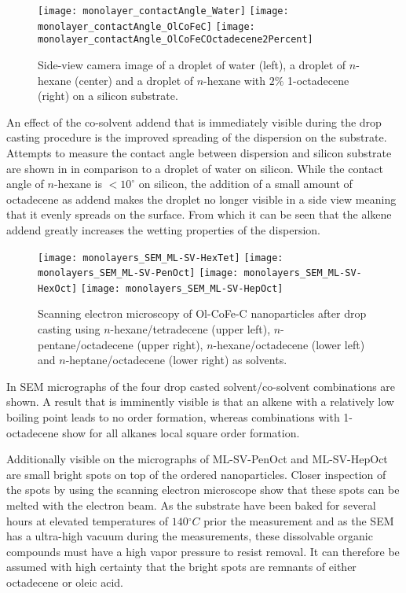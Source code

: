 \documentclass[\main/dresen_thesis.tex]{subfiles}
\begin{document}
    \begin{figure}[tb]
      \centering
      \texttt{[image: monolayer\_contactAngle\_Water]}
      \texttt{[image: monolayer\_contactAngle\_OlCoFeC]}
      \texttt{[image: monolayer\_contactAngle\_OlCoFeCOctadecene2Percent]}
      \caption{\label{fig:monolayers:preparation:contactAngle}Side-view camera image of a droplet of water (left), a droplet of $\mathit{n}$-hexane (center) and a droplet of $\mathit{n}$-hexane with $2 \unit{\%}$ 1-octadecene (right) on a silicon substrate.}
    \end{figure}
    An effect of the co-solvent addend that is immediately visible during the drop casting procedure is the improved spreading of the dispersion on the substrate.
    Attempts to measure the contact angle between dispersion and silicon substrate are shown in  in comparison to a droplet of water on silicon.
    While the contact angle of $\mathit{n}$-hexane is $<10^\circ$ on silicon, the addition of a small amount of octadecene as addend makes the droplet no longer visible in a side view meaning that it evenly spreads on the surface.
    From which it can be seen that the alkene addend greatly increases the wetting properties of the dispersion.

    \begin{figure}[tb]
      \centering
      \texttt{[image: monolayers\_SEM\_ML-SV-HexTet]}
      \texttt{[image: monolayers\_SEM\_ML-SV-PenOct]}
      \texttt{[image: monolayers\_SEM\_ML-SV-HexOct]}
      \texttt{[image: monolayers\_SEM\_ML-SV-HepOct]}
      \caption{\label{fig:monolayers:preparation:solventVariation:sem}Scanning electron microscopy of Ol-CoFe-C nanoparticles after drop casting using $\mathit{n}$-hexane/tetradecene (upper left), $\mathit{n}$-pentane/octadecene (upper right), $\mathit{n}$-hexane/octadecene (lower left) and $\mathit{n}$-heptane/octadecene (lower right) as solvents.}
    \end{figure}
    In  SEM micrographs of the four drop casted solvent/co-solvent combinations are shown.
    A result that is imminently visible is that an alkene with a relatively low boiling point leads to no order formation, whereas  combinations with 1-octadecene show for all alkanes local square order formation.

    Additionally visible on the micrographs of ML-SV-PenOct and ML-SV-HepOct are small bright spots on top of the ordered nanoparticles.
    Closer inspection of the spots by using the scanning electron microscope show that these spots can be melted with the electron beam.
    As the substrate have been baked for several hours at elevated temperatures of $140 \unit{^\circ C}$ prior the measurement and as the SEM has a ultra-high vacuum during the measurements, these dissolvable organic compounds must have a high vapor pressure to resist removal.
    It can therefore be assumed with high certainty that the bright spots are remnants of either octadecene or oleic acid.
\end{document}
